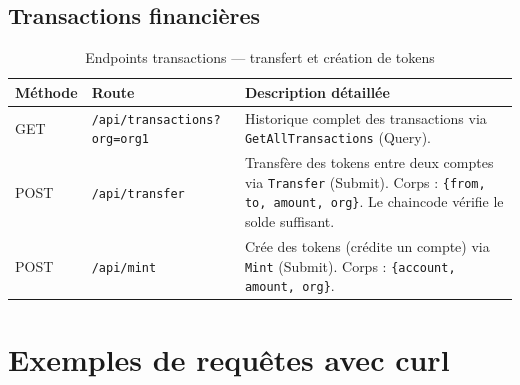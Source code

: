 \documentclass[12pt,a4paper,twoside]{report}
\begin{document}
\subsection{Transactions financières}

\begin{table}[H]
\centering
\begin{tabularx}{\textwidth}{llX}
\toprule
\textbf{Méthode} & \textbf{Route} & \textbf{Description détaillée} \\
\midrule
GET & \texttt{/api/transactions?org=org1} & Historique complet des transactions via \texttt{GetAllTransactions} (Query). \\
POST & \texttt{/api/transfer} & Transfère des tokens entre deux comptes via \texttt{Transfer} (Submit). Corps : \texttt{\{from, to, amount, org\}}. Le chaincode vérifie le solde suffisant. \\
POST & \texttt{/api/mint} & Crée des tokens (crédite un compte) via \texttt{Mint} (Submit). Corps : \texttt{\{account, amount, org\}}. \\
\bottomrule
\end{tabularx}
\caption{Endpoints transactions --- transfert et création de tokens}
\end{table}

\section{Exemples de requêtes avec curl}
\end{document}
